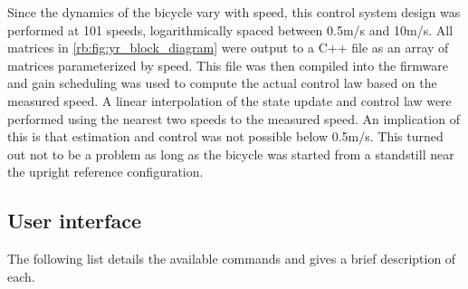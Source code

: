 Since the dynamics of the bicycle vary with speed, this control system design
was performed at 101 speeds, logarithmically spaced between 0.5m/s and 10m/s.
All matrices in \autoref{rb:fig:yr_block_diagram} were output to a C++ file as
an array of matrices parameterized by speed. This file was then compiled into
the firmware and gain scheduling was used to compute the actual control law
based on the measured speed. A linear interpolation of the state update and
control law were performed using the nearest two speeds to the measured speed.
An implication of this is that estimation and control was not possible below
0.5m/s. This turned out not to be a problem as long as the bicycle was started
from a standstill near the upright reference configuration.

\subsection{User interface} \label{rb:subsec:ui}
The following list details the available commands and gives a brief description
of each.

